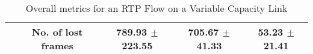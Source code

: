 \begin{table}[!htbp]
{\begin{tabular}{c c c c c}
  & \textbf{No. of lost frames} & 789.93 $\pm$223.55 & 705.67 $\pm$41.33 & 53.23  $\pm$21.41 \\ \hline
  \end{tabular}
  }
  \caption{Overall metrics for an RTP Flow on a Variable Capacity Link}
  \label{table:fecrc-var-res}
\end{table}


\begin{figure}
  \centerline{
}
\caption{}
\label{fig:fecrc-dnet}
\end{figure}
